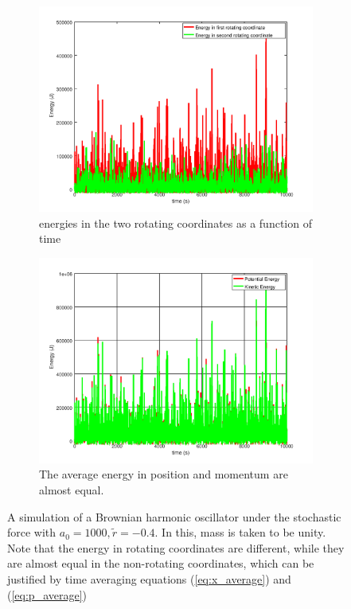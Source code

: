 \documentclass[12pt, twoside]{article}
\begin{document}
\begin{figure}[h!]
\begin{subfigure}[h!]{0.45\linewidth}
		\includegraphics[width=\linewidth]{graphs/simulation/rotating_energies.png}
		\caption{energies in the two rotating coordinates as a function of time}
	\end{subfigure}
	\begin{subfigure}[h!]{0.45\linewidth}
		\includegraphics[width=\linewidth]{graphs/simulation/kinetic_potential.png}
		\caption{The average energy in position and momentum are almost equal.}
	\end{subfigure}
	\caption{A simulation of a Brownian harmonic oscillator under the stochastic force with $a_0 = 1000, \tilde{r} = -0.4$. In this, mass is taken to be unity. Note that the energy in rotating coordinates are different, while they are almost equal in the non-rotating coordinates, which can be justified by time averaging equations (\ref{eq:x_average}) and (\ref{eq:p_average})}
	
\end{figure}
\end{document}
